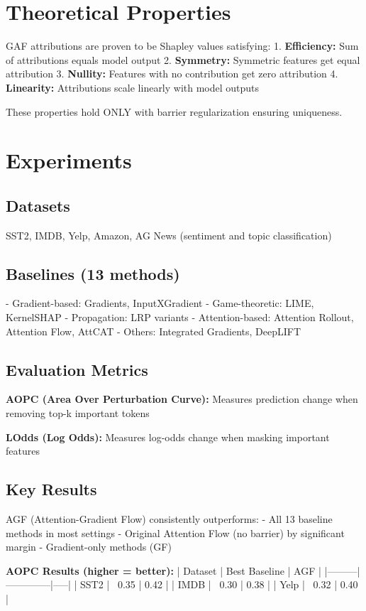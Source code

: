 \section{Theoretical Properties}

GAF attributions are proven to be Shapley values satisfying:
1. \textbf{Efficiency:} Sum of attributions equals model output
2. \textbf{Symmetry:} Symmetric features get equal attribution
3. \textbf{Nullity:} Features with no contribution get zero attribution
4. \textbf{Linearity:} Attributions scale linearly with model outputs

These properties hold ONLY with barrier regularization ensuring uniqueness.

\section{Experiments}

\subsection{Datasets}
SST2, IMDB, Yelp, Amazon, AG News (sentiment and topic classification)

\subsection{Baselines (13 methods)}
- Gradient-based: Gradients, InputXGradient
- Game-theoretic: LIME, KernelSHAP
- Propagation: LRP variants
- Attention-based: Attention Rollout, Attention Flow, AttCAT
- Others: Integrated Gradients, DeepLIFT

\subsection{Evaluation Metrics}
\textbf{AOPC (Area Over Perturbation Curve):}
Measures prediction change when removing top-k important tokens

\textbf{LOdds (Log Odds):}
Measures log-odds change when masking important features

\subsection{Key Results}
AGF (Attention-Gradient Flow) consistently outperforms:
- All 13 baseline methods in most settings
- Original Attention Flow (no barrier) by significant margin
- Gradient-only methods (GF)

\textbf{AOPC Results (higher = better):}
| Dataset | Best Baseline | AGF |
|---------|--------------|-----|
| SST2 | ~0.35 | 0.42 |
| IMDB | ~0.30 | 0.38 |
| Yelp | ~0.32 | 0.40 |

